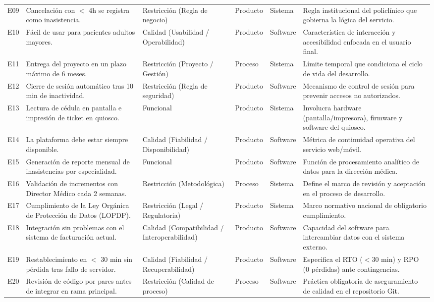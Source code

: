 \documentclass[conference]{IEEEtran}
\begin{document}
\begin{center}
\begin{tabularx}{\textwidth}{@{}p{0.6cm}p{3.6cm}p{3.4cm}p{1.4cm}p{1.4cm}>{\raggedright\arraybackslash}X@{}}
E09 & Cancelaci\'on con $<$ 4h se registra como inasistencia. & Restricci\'on (Regla de negocio) & Producto & Sistema & Regla institucional del policl\'inico que gobierna la l\'ogica del servicio.\\
E10 & F\'acil de usar para pacientes adultos mayores. & Calidad (Usabilidad / Operabilidad) & Producto & Software & Caracter\'istica de interacci\'on y accesibilidad enfocada en el usuario final.\\
E11 & Entrega del proyecto en un plazo m\'aximo de 6 meses. & Restricci\'on (Proyecto / Gesti\'on) & Proceso & Sistema & L\'imite temporal que condiciona el ciclo de vida del desarrollo.\\
E12 & Cierre de sesi\'on autom\'atico tras 10 min de inactividad. & Restricci\'on (Regla de seguridad) & Producto & Software & Mecanismo de control de sesi\'on para prevenir accesos no autorizados.\\
E13 & Lectura de c\'edula en pantalla e impresi\'on de ticket en quiosco. & Funcional & Producto & Sistema & Involucra hardware (pantalla/impresora), firmware y software del quiosco.\\
E14 & La plataforma debe estar siempre disponible. & Calidad (Fiabilidad / Disponibilidad) & Producto & Software & M\'etrica de continuidad operativa del servicio web/m\'ovil.\\
E15 & Generaci\'on de reporte mensual de inasistencias por especialidad. & Funcional & Producto & Software & Funci\'on de procesamiento anal\'itico de datos para la direcci\'on m\'edica.\\
E16 & Validaci\'on de incrementos con Director M\'edico cada 2 semanas. & Restricci\'on (Metodol\'ogica) & Proceso & Sistema & Define el marco de revisi\'on y aceptaci\'on en el proceso de desarrollo.\\
E17 & Cumplimiento de la Ley Org\'anica de Protecci\'on de Datos (LOPDP). & Restricci\'on (Legal / Regulatoria) & Producto & Sistema & Marco normativo nacional de obligatorio cumplimiento.\\
E18 & Integraci\'on sin problemas con el sistema de facturaci\'on actual. & Calidad (Compatibilidad / Interoperabilidad) & Producto & Software & Capacidad del software para intercambiar datos con el sistema externo.\\
E19 & Restablecimiento en $<$ 30 min sin p\'erdida tras fallo de servidor. & Calidad (Fiabilidad / Recuperabilidad) & Producto & Software & Especifica el RTO ($<$30 min) y RPO (0 p\'erdidas) ante contingencias.\\
E20 & Revisi\'on de c\'odigo por pares antes de integrar en rama principal. & Restricci\'on (Calidad de proceso) & Proceso & Software & Pr\'actica obligatoria de aseguramiento de calidad en el repositorio Git.\\
\bottomrule
\end{tabularx}
\end{center}
\end{document}
